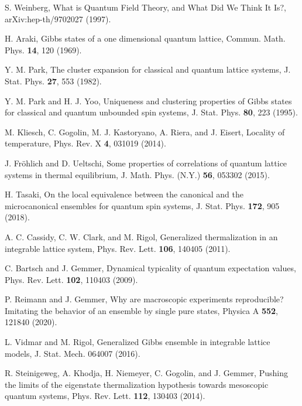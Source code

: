 \documentclass[twocolumn,aps,prb,floatfix,superscriptaddress]{revtex4-2}
\newcommand{\<}{\left\langle}	%
\renewcommand{\>}{\right\rangle}	%
\begin{document}
\begin{thebibliography}{70}
S. Weinberg, 
{What is Quantum Field Theory, and What Did We Think It Is?},
arXiv:hep-th/9702027 (1997).

H. Araki,
Gibbs states of a one dimensional quantum lattice,
Commun. Math. Phys. {\bf 14}, 120 (1969).

Y. M. Park,
The cluster expansion for classical and quantum lattice systems,
J. Stat. Phys. {\bf 27}, 553 (1982).

Y. M. Park and H. J. Yoo,
Uniqueness and clustering properties of Gibbs states 
for classical and quantum unbounded spin systems,
J. Stat. Phys. {\bf 80}, 223 (1995).

M. Kliesch, C. Gogolin, M. J. Kastoryano, A. Riera, and J. Eisert,
Locality of temperature,
Phys. Rev. X {\bf 4}, 031019 (2014).

J. Fr\"ohlich and D. Ueltschi,
Some properties of correlations of quantum lattice 
systems in thermal equilibrium,
J. Math. Phys. (N.Y.) {\bf 56}, 053302 (2015).

H. Tasaki,
On the local equivalence between the canonical and the microcanonical 
ensembles for quantum spin systems,
J. Stat. Phys. {\bf 172}, 905 (2018).

A. C. Cassidy, C. W. Clark, and M. Rigol,
Generalized thermalization in an integrable lattice system,
Phys. Rev. Lett. {\bf 106}, 140405 (2011).

C. Bartsch and J. Gemmer, 
Dynamical typicality of quantum expectation values,
Phys. Rev. Lett. {\bf 102}, 110403 (2009).

P. Reimann and J. Gemmer,
Why are macroscopic experiments reproducible? 
Imitating the behavior of an ensemble by single pure states,
Physica A {\bf 552}, 121840 (2020).

L. Vidmar and M. Rigol,
Generalized Gibbs ensemble in integrable lattice models,
J. Stat. Mech. 064007 (2016).

R. Steinigeweg, A. Khodja, H. Niemeyer, C. Gogolin, and J. Gemmer,
Pushing the limits of the eigenstate thermalization hypothesis towards mesoscopic quantum systems,
Phys. Rev. Lett. {\bf 112}, 130403 (2014).


\end{thebibliography}
\end{document}
